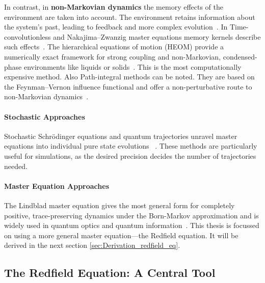 \noindent
In contrast, in \textbf{non-Markovian dynamics} the memory effects of the environment are taken into account. The environment retains information about the system's past, leading to feedback and more complex evolution~\cite{breuerpetruccione2009theoryopenquantum, rivasetal2014quantumnonmarkovianitycharacterization}.
\noindent
In Time-convolutionless and Nakajima–Zwanzig master equations memory kernels describe such effects~\cite{breuerpetruccione2009theoryopenquantum, rivasetal2014quantumnonmarkovianitycharacterization}. The hierarchical equations of motion (HEOM) provide a numerically exact framework for strong coupling and non-Markovian, condensed-phase environments like liquids or solids~\cite{tanimura2020numericallyexactapproach}. This is the most computationally expensive method. Also Path-integral methods can be noted. They are based on the Feynman–Vernon influence functional and offer a non-perturbative route to non-Markovian dynamics~\cite{weiss2012quantumdissipativesystems}.


\paragraph{Stochastic Approaches}

\noindent
Stochastic Schrödinger equations and quantum trajectories unravel master equations into individual pure state evolutions ~\cite{vogtetal2013stochasticblochredfieldtheory, breuerpetruccione2009theoryopenquantum, carmichael1993opensystemsapproach}. These methods are particularly useful for simulations, as the desired precision decides the number of trajectories needed.

\paragraph{Master Equation Approaches}

\noindent
The Lindblad master equation gives the most general form for completely positive, trace-preserving dynamics under the Born-Markov approximation and is widely used in quantum optics and quantum information~\cite{breuerpetruccione2009theoryopenquantum, lindblad1976generatorsquantumdynamical}.
This thesis is focussed on using a more general master equation—the Redfield equation. It will be derived in the next section \ref{sec:Derivation_redfield_eq}.


\subsection{The Redfield Equation: A Central Tool}

